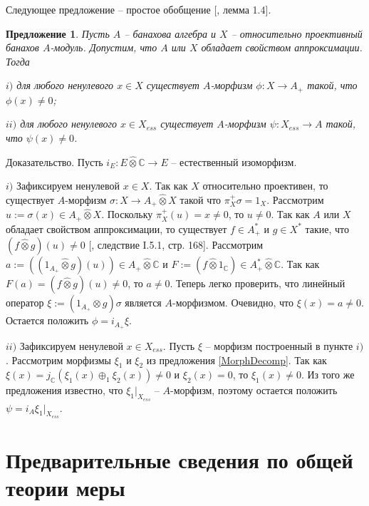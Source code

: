 \documentclass[12pt]{article}
\numberwithin{equation}{subsection}
\theoremstyle{plain}
\newtheorem{proposition}{Предложение}
\newenvironment{proof}{Доказательство.}{}
\newcommand{\projtens}{\mathbin{\widehat{\otimes}}}
\begin{document}
\begin{fulltext}
    Следующее предложение -- простое обобщение [\cite{SelivBiprojBanAlg}, лемма 1.4].

    \begin{proposition}\label{RelProjNecesCond} Пусть $A$ -- банахова алгебра и $X$ -- относительно проективный банахов $A$-модуль. Допустим, что $A$ или $X$ обладает свойством аппроксимации. Тогда

        $i)$ для любого ненулевого $x\in X$ существует $A$-морфизм $\phi:X\to A_+$ такой, что $\phi(x)\neq 0$;

        $ii)$ для любого ненулевого $x\in X_{ess}$ существует $A$-морфизм $\psi:X_{ess}\to A$ такой, что $\psi(x)\neq 0$.
    \end{proposition}
    \begin{proof} Пусть $i_E:E\projtens \mathbb{C}\to E$ -- естественный изоморфизм.

        $i)$ Зафиксируем ненулевой $x\in X$. Так как $X$ относительно проективен, то существует $A$-морфизм $\sigma:X\to A_+\projtens X$ такой что $\pi_X^+\sigma=1_X$. Рассмотрим $u:=\sigma(x)\in A_+\projtens X$. Поскольку $\pi_X^+(u)=x\neq 0$, то $u\neq 0$. Так как $A$ или $X$ обладает свойством аппроксимации, то существует $f\in A_+^*$ и $g\in X^*$ такие, что $(f\projtens g)(u)\neq 0$ [\cite{GrothProdTenTopNucl}, следствие I.5.1, стр. 168]. Рассмотрим $a:=((1_{A_+}\projtens g)(u))\in A_+\projtens\mathbb{C}$ и $F:=(f\projtens 1_{\mathbb{C}})\in A_+^*\projtens\mathbb{C}$. Так как $F(a)=(f\projtens g)(u)\neq 0$, то $a\neq 0$. Теперь легко проверить, что линейный оператор $\xi:=(1_{A_+}\projtens g)\sigma$ является $A$-морфизмом. Очевидно, что $\xi(x)=a\neq 0$. Остается положить $\phi=i_{A_+}\xi$.

        $ii)$ Зафиксируем ненулевой $x\in X_{ess}$. Пусть $\xi$ -- морфизм построенный в пункте $i)$. Рассмотрим морфизмы $\xi_1$ и $\xi_2$ из предложения \ref{MorphDecomp}. Так как $\xi(x)=j_{\mathbb{C}}(\xi_1(x)\oplus_1\xi_2(x))\neq 0$ и $\xi_2(x)=0$, то $\xi_1(x)\neq 0$. Из того же предложения известно, что $\xi_1|_{X_{ess}}$ -- $A$-морфизм, поэтому остается положить $\psi=i_A \xi_1|_{X_{ess}}$.

    \end{proof}


    \section{Предварительные сведения по общей теории меры}
    \label{SectionPreliminariesOnGeneralMeasureTheory}


\end{fulltext}
\end{document}
